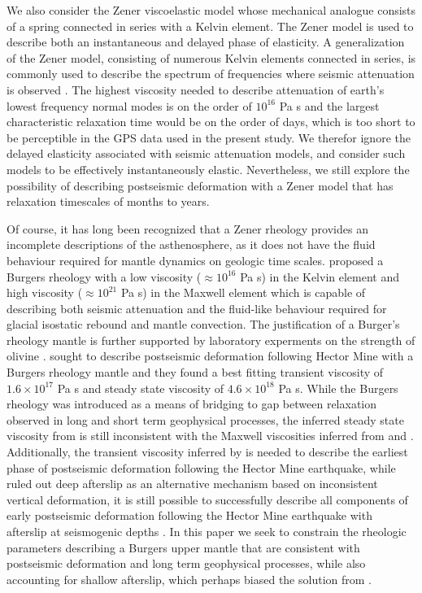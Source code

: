 \documentclass[12pt]{article}
\begin{document}
We also consider the Zener viscoelastic model whose mechanical analogue consists of a spring connected in series with a Kelvin element. The Zener model is used to describe both an instantaneous and delayed phase of elasticity.  A generalization of the Zener model, consisting of numerous Kelvin elements connected in series, is commonly used to describe the spectrum of frequencies where seismic attenuation is observed \cite{Liu1976}.  The highest viscosity needed to describe attenuation of earth's lowest frequency normal modes is on the order of $10^{16}$ Pa s \cite{Yuen1982} and the largest characteristic relaxation time would be on the order of days, which is too short to be perceptible in the GPS data used in the present study. We therefor ignore the delayed elasticity associated with seismic attenuation models, and consider such models to be effectively instantaneously elastic. Nevertheless, we still explore the possibility of describing postseismic deformation with a Zener model that has relaxation timescales of months to years.  

Of course, it has long been recognized that a Zener rheology provides an incomplete descriptions of the asthenosphere, as it does not have the fluid behaviour required for mantle dynamics on geologic time scales. \cite{Yuen1982} proposed a Burgers rheology with a low viscosity ($\approx 10^{16}$ Pa s) in the Kelvin element and high viscosity ($\approx 10^{21}$ Pa s) in the Maxwell element which is capable of describing both seismic attenuation and the fluid-like behaviour required for glacial isostatic rebound and mantle convection. The justification of a Burger's rheology mantle is further supported by laboratory experments on the strength of olivine \cite{Chopra1997}. \cite{Pollitz2003} sought to describe postseismic deformation following Hector Mine with a Burgers rheology mantle and they found a best fitting transient viscosity of $1.6\times10^{17}$ Pa s and steady state viscosity of $4.6\times10^{18}$ Pa s. While the Burgers rheology was introduced as a means of bridging to gap between relaxation observed in long and short term geophysical processes, the inferred steady state viscosity from \cite{Pollitz2003} is still inconsistent with the Maxwell viscosities inferred from \cite{Lundgren2009} and \cite{Luttrell2007}. Additionally, the transient viscosity inferred by \cite{Pollitz2003} is needed to describe the earliest phase of postseismic deformation following the Hector Mine earthquake, while \cite{Pollitz2003} ruled out deep afterslip as an alternative mechanism based on inconsistent vertical deformation, it is still possible to successfully describe all components of early postseismic deformation following the Hector Mine earthquake with afterslip at seismogenic depths \cite{Jacobs2002}. In this paper we seek to constrain the rheologic parameters describing a Burgers upper mantle that are consistent with postseismic deformation and long term geophysical processes, while also accounting  for shallow afterslip, which perhaps biased the solution from \cite{Pollitz2003}.
\end{document}
